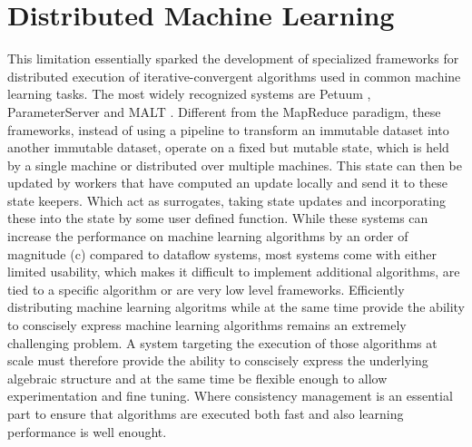 \section{Distributed Machine Learning}
This limitation essentially sparked the development of specialized frameworks for distributed execution of iterative-convergent algorithms used in common machine learning tasks.
The most widely recognized systems are Petuum \cite{Xing2015}, ParameterServer \cite{Li2014} and MALT \cite{Li2015}.
Different from the MapReduce paradigm, these frameworks, instead of using a pipeline to transform an immutable dataset into another immutable dataset, operate on a fixed but mutable state, which is held by a single machine or distributed over multiple machines.
This state can then be updated by workers that have computed an update locally and send it to these state keepers. Which act as surrogates, taking state updates and incorporating these into the state by some user defined function.
While these systems can increase the performance on machine learning algorithms by an order of magnitude (c) compared to dataflow systems, most systems come with either limited usability, which makes it difficult to implement additional algorithms, are tied to a specific algorithm or are very low level frameworks.
Efficiently distributing machine learning algoritms while at the same time provide the ability to conscisely express machine learning algorithms remains an extremely challenging problem.
A system targeting the execution of those algorithms at scale must therefore provide the ability to conscisely express the underlying algebraic structure and at the same time be flexible enough to allow experimentation and fine tuning.
Where consistency management is an essential part to ensure that algorithms are executed both fast and also learning performance is well enought.



